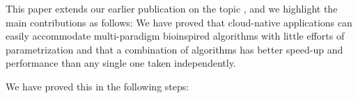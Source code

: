 \documentclass[review]{elsarticle}
\begin{document}

This paper extends our earlier publication on the topic
\cite{guervos2018introducing}, and we highlight the main contributions as
follows:
We have proved that cloud-native applications can easily accommodate multi-paradigm bioinspired algorithms
with little efforts of parametrization and
that a combination of algorithms has better speed-up and performance
than any single one taken independently.

We have proved this in the following steps:
\end{document}
